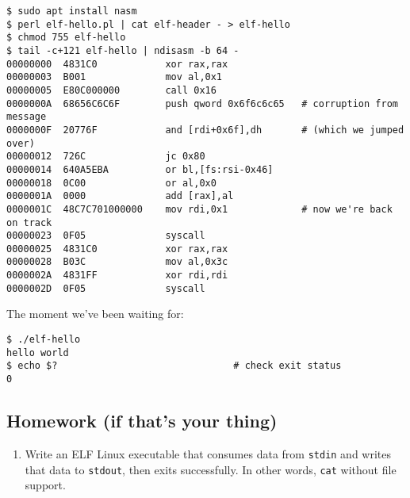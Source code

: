 \documentclass{article}
\begin{document}
  \begin{verbatim}
$ sudo apt install nasm
$ perl elf-hello.pl | cat elf-header - > elf-hello
$ chmod 755 elf-hello
$ tail -c+121 elf-hello | ndisasm -b 64 -
00000000  4831C0            xor rax,rax
00000003  B001              mov al,0x1
00000005  E80C000000        call 0x16
0000000A  68656C6C6F        push qword 0x6f6c6c65   # corruption from message
0000000F  20776F            and [rdi+0x6f],dh       # (which we jumped over)
00000012  726C              jc 0x80
00000014  640A5EBA          or bl,[fs:rsi-0x46]
00000018  0C00              or al,0x0
0000001A  0000              add [rax],al
0000001C  48C7C701000000    mov rdi,0x1             # now we're back on track
00000023  0F05              syscall
00000025  4831C0            xor rax,rax
00000028  B03C              mov al,0x3c
0000002A  4831FF            xor rdi,rdi
0000002D  0F05              syscall
  \end{verbatim}

  The moment we've been waiting for:

  \begin{verbatim}
$ ./elf-hello
hello world
$ echo $?                               # check exit status
0
  \end{verbatim}

  \subsection{Homework (if that's your thing)}
  \begin{enumerate}
    \item Write an ELF Linux executable that consumes data from {\tt stdin} and
          writes that data to {\tt stdout}, then exits successfully. In other
          words, {\tt cat} without file support.
  \end{enumerate}
\end{document}
